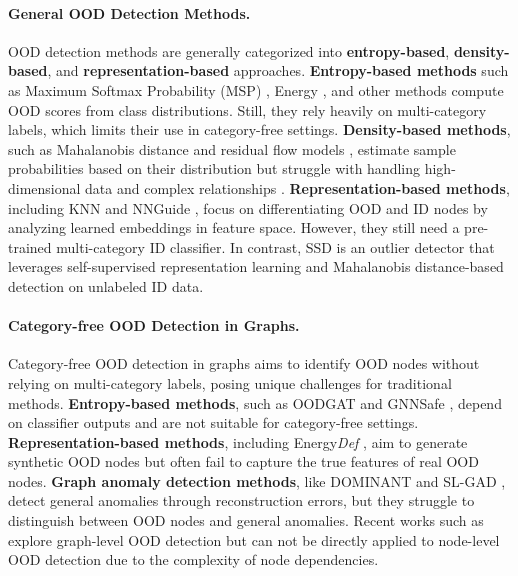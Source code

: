 \paragraph{General OOD Detection Methods.}  
OOD detection methods are generally categorized into \textbf{entropy-based}, \textbf{density-based}, and \textbf{representation-based} approaches. \textbf{Entropy-based methods} such as Maximum Softmax Probability (MSP) \citep{hendrycks2016baseline}, Energy \citep{liu2020energy}, and other methods \citep{liang2017enhancing, bendale2016towards, hendrycks2018deep, geifman2019selectivenet, malinin2018predictive, jeong2020ood, chen2021atom, wei2021open, ming2022cider, ming2022poem} compute OOD scores from class distributions. Still, they rely heavily on multi-category labels, which limits their use in category-free settings. \textbf{Density-based methods}, such as Mahalanobis distance \citep{lee2018simple} and residual flow models \citep{zisselman2020deep}, estimate sample probabilities based on their distribution but struggle with handling high-dimensional data and complex relationships \citep{ren2019likelihood, serra2019input}. \textbf{Representation-based methods}, including KNN \citep{sun2022out} and NNGuide \citep{park2023nearest}, focus on differentiating OOD and ID nodes by analyzing learned embeddings in feature space. However, they still need a pre-trained multi-category ID classifier. In contrast, SSD \citep{sehwag2021ssd} is an outlier detector that leverages self-supervised representation learning and Mahalanobis distance-based detection on unlabeled ID data. 

\paragraph{Category-free OOD Detection in Graphs.}  
Category-free OOD detection in graphs aims to identify OOD nodes without relying on multi-category labels, posing unique challenges for traditional methods. \textbf{Entropy-based methods}, such as OODGAT \citep{song2022learning} and GNNSafe \citep{wu2023energy}, depend on classifier outputs and are not suitable for category-free settings. \textbf{Representation-based methods}, including Energy\textit{Def} \citep{gong2024energy}, aim to generate synthetic OOD nodes but often fail to capture the true features of real OOD nodes. \textbf{Graph anomaly detection methods}, like DOMINANT \citep{ding2019deep} and SL-GAD \citep{zheng2021generative}, detect general anomalies through reconstruction errors, but they struggle to distinguish between OOD nodes and general anomalies. Recent works such as \citep{li2022graphde, bazhenov2022towards, liu2023good, ding2023sgood} explore graph-level OOD detection but can not be directly applied to node-level OOD detection due to the complexity of node dependencies.